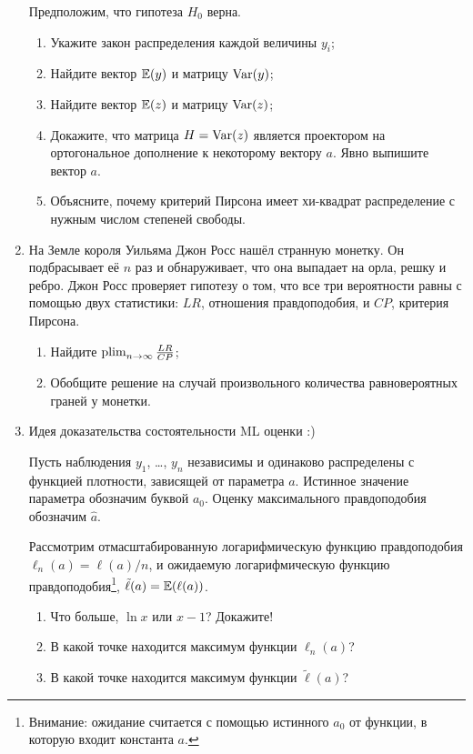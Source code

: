 \begin{enumerate}
Предположим, что гипотеза $H_0$ верна.
\begin{enumerate}
    \item Укажите закон распределения каждой величины $y_i$;
    \item Найдите вектор $\operatorname{\mathbb{E}}(y)$ и матрицу $\operatorname{Var}(y)$;
    \item Найдите вектор $\operatorname{\mathbb{E}}(z)$ и матрицу $\operatorname{Var}(z)$;
    \item Докажите, что матрица $H=\operatorname{Var}(z)$ является проектором на ортогональное дополнение к некоторому вектору $a$. 
  Явно выпишите вектор $a$.
  \item Объясните, почему критерий Пирсона имеет хи-квадрат распределение с нужным числом степеней свободы.
\end{enumerate}

\newpage

\item На Земле короля Уильяма Джон Росс нашёл странную монетку. 
Он подбрасывает её $n$ раз и обнаруживает, что она выпадает на орла, решку и ребро. 
Джон Росс проверяет гипотезу о том, что все три вероятности равны с помощью двух статистики: 
$LR$, отношения правдоподобия, и $CP$, критерия Пирсона. 

\begin{enumerate}
\item Найдите $\operatorname*{plim}_{n\to\infty} \frac{LR}{CP}$;
\item Обобщите решение на случай произвольного количества равновероятных граней у монетки.    
\end{enumerate}

\item Идея доказательства состоятельности ML оценки :)

Пусть наблюдения $y_1$, \ldots, $y_n$ независимы и одинаково распределены с функцией плотности, зависящей от параметра $a$.
Истинное значение параметра обозначим буквой $a_0$. Оценку максимального правдоподобия обозначим $\hat a$.

Рассмотрим отмасштабированную логарифмическую функцию правдоподобия $\ell_n(a)=\ell(a) / n$, и
ожидаемую логарифмическую функцию правдоподобия\footnote{Внимание:
ожидание считается с помощью истинного $a_0$ от функции, в которую входит константа $a$.},
$\tilde \ell(a)=\operatorname{\mathbb{E}}(\ell(a))$.
\begin{enumerate}
\item Что больше, $\ln x$ или $x-1$? Докажите!
\item В какой точке находится максимум функции $\ell_n(a)$?
\item В какой точке находится максимум функции $\tilde \ell(a)$?


\end{enumerate}
\end{enumerate}
